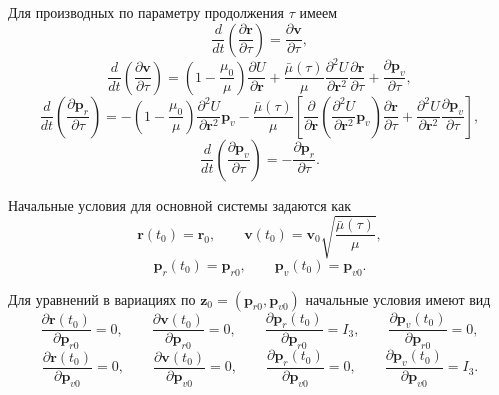 Для производных по параметру продолжения \(\tau\) имеем
\begin{equation}
	\frac{d}{dt}
	\left(
	\frac{\partial \mathbf r}{\partial \tau}
	\right)
	=
	\frac{\partial \mathbf v}{\partial \tau},
\end{equation}
\begin{equation}
	\frac{d}{dt}
	\left(
	\frac{\partial \mathbf v}{\partial \tau}
	\right)
	=
	\left(1-\frac{\mu_0}{\mu}\right)
	\frac{\partial U}{\partial \mathbf r}
	+
	\frac{\bar\mu(\tau)}{\mu}
	\frac{\partial^2 U}{\partial \mathbf r^2}
	\frac{\partial \mathbf r}{\partial \tau}
	+
	\frac{\partial \mathbf p_v}{\partial \tau},
\end{equation}
\begin{equation}
	\frac{d}{dt}
	\left(
	\frac{\partial \mathbf p_r}{\partial \tau}
	\right)
	=
	-
	\left(1-\frac{\mu_0}{\mu}\right)
	\frac{\partial^2 U}{\partial \mathbf r^2}
	\mathbf p_v
	-
	\frac{\bar\mu(\tau)}{\mu}
	\left[
	\frac{\partial}{\partial \mathbf r}
	\left(
	\frac{\partial^2 U}{\partial \mathbf r^2}\mathbf p_v
	\right)
	\frac{\partial \mathbf r}{\partial \tau}
	+
	\frac{\partial^2 U}{\partial \mathbf r^2}
	\frac{\partial \mathbf p_v}{\partial \tau}
	\right],
\end{equation}
\begin{equation}
	\frac{d}{dt}
	\left(
	\frac{\partial \mathbf p_v}{\partial \tau}
	\right)
	=
	-
	\frac{\partial \mathbf p_r}{\partial \tau}.
\end{equation}

Начальные условия для основной системы задаются как
\begin{equation}
	\mathbf r(t_0)=\mathbf r_0,
	\qquad
	\mathbf v(t_0)=\mathbf v_0\sqrt{\frac{\bar\mu(\tau)}{\mu}},
\end{equation}
\begin{equation}
	\mathbf p_r(t_0)=\mathbf p_{r0},
	\qquad
	\mathbf p_v(t_0)=\mathbf p_{v0}.
\end{equation}

Для уравнений в вариациях по \(\mathbf z_0=(\mathbf p_{r0},\mathbf p_{v0})\) начальные условия имеют вид
\begin{equation}
	\frac{\partial \mathbf r(t_0)}{\partial \mathbf p_{r0}}=0,
	\qquad
	\frac{\partial \mathbf v(t_0)}{\partial \mathbf p_{r0}}=0,
	\qquad
	\frac{\partial \mathbf p_r(t_0)}{\partial \mathbf p_{r0}}=I_3,
	\qquad
	\frac{\partial \mathbf p_v(t_0)}{\partial \mathbf p_{r0}}=0,
\end{equation}
\begin{equation}
	\frac{\partial \mathbf r(t_0)}{\partial \mathbf p_{v0}}=0,
	\qquad
	\frac{\partial \mathbf v(t_0)}{\partial \mathbf p_{v0}}=0,
	\qquad
	\frac{\partial \mathbf p_r(t_0)}{\partial \mathbf p_{v0}}=0,
	\qquad
	\frac{\partial \mathbf p_v(t_0)}{\partial \mathbf p_{v0}}=I_3.
\end{equation}

